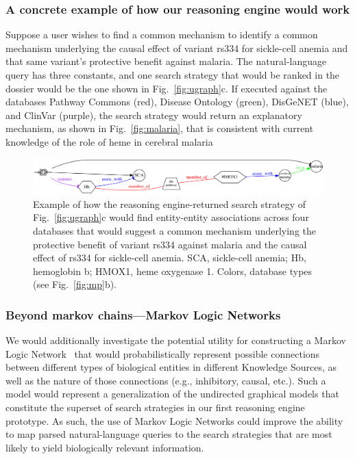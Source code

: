 \documentclass[11pt,notitlepage]{article}
\begin{document}
\subsubsection{A concrete example of how our reasoning engine would work}
Suppose a user wishes to find a common mechanism to identify a common
mechanism underlying the causal effect of variant rs334 for sickle-cell anemia
and that same variant's protective benefit against malaria. The natural-language
query has three constants, and one search strategy that would be ranked in the dossier
would be the one shown in Fig.~\ref{fig:ugraph}c. If executed against the databases
Pathway Commons (red), Disease Ontology (green), DisGeNET (blue), and ClinVar (purple),
the search strategy would return an explanatory mechanism, as shown in Fig.~\ref{fig:malaria},
that is consistent with current knowledge of the role of heme in cerebral malaria~\cite{Ferreira:2011ff}
\begin{figure}[h!]
     \includegraphics[width=6in]{net5.png} 
     \caption{Example of how the reasoning engine-returned search strategy of
       Fig.~\ref{fig:ugraph}c would find entity-entity associations across four
       databases that would suggest a common mechanism underlying the
       protective benefit of variant rs334 against malaria and the causal effect
       of rs334 for sickle-cell anemia. SCA, sickle-cell anemia; Hb,
       hemoglobin b; HMOX1, heme oxygenase 1.  Colors, database
       types (see Fig.~\ref{fig:mp}b).}
  \label{fig:networks}
\end{figure}

\subsubsection{Beyond markov chains---Markov Logic Networks}
We would additionally investigate the potential utility for constructing a
Markov Logic Network~\cite{Domingos:2012wi,domingos20071} that would
probabilistically represent possible connections between different types of
biological entities in different Knowledge Sources, as well as the nature of
those connections (e.g., inhibitory, causal, etc.). Such a model would represent
a generalization of the undirected graphical models that constitute the superset
of search strategies in our first reasoning engine prototype. As such, the use
of Markov Logic Networks could improve the ability to map parsed
natural-language queries to the search strategies that are most likely to yield
biologically relevant information.
\end{document}

